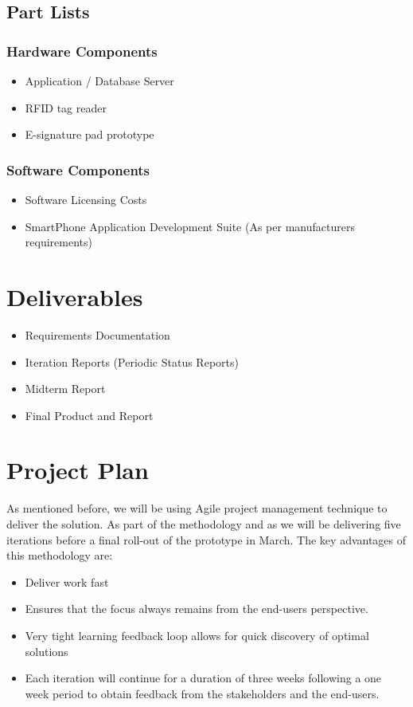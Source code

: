 \documentclass{journal}
\begin{document}
\subsection{Part Lists} 

\subsubsection{ Hardware Components }
\begin{itemize}
\item{Application / Database Server}
\item{RFID tag reader}
\item{E-signature pad prototype}
\end{itemize}

\subsubsection{ Software Components }
\begin{itemize}
\item{Software Licensing Costs }
\item{SmartPhone Application Development Suite (As per manufacturers requirements)}
\end{itemize}

\section{Deliverables}
\begin{itemize}
 \item{ Requirements Documentation }
 \item{ Iteration Reports (Periodic Status Reports) }
 \item{ Midterm Report}
 \item{ Final Product and Report }
\end{itemize}
\section{Project Plan}
As mentioned before, we will be using Agile project management technique to deliver the solution. As part of the methodology and as we will be delivering five iterations before a final roll-out of the prototype in March. The key advantages of this methodology are:
\begin{itemize}
\item Deliver work fast
\item Ensures that the focus always remains from the end-users perspective. 
\item Very tight learning feedback loop allows for quick discovery of optimal solutions
\item Each iteration will continue for a duration of three weeks following a one week period to obtain feedback from the stakeholders and the end-users.
\end{itemize}
\newpage
\thispagestyle{empty}
\end{document}
